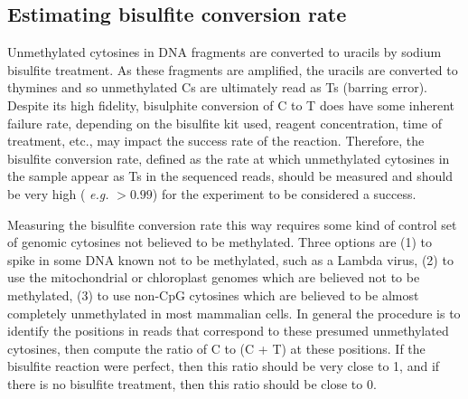 \documentclass[10pt]{article}
\begin{document}


\subsection{Estimating bisulfite conversion rate}
\label{sec:estim-busilf-conv}

Unmethylated cytosines in DNA fragments are converted to uracils by
sodium bisulfite treatment. As these fragments are amplified, the
uracils are converted to thymines and so unmethylated Cs are
ultimately read as Ts (barring error). Despite its high fidelity,
bisulphite conversion of C to T does have some inherent failure rate,
depending on the bisulfite kit used, reagent concentration, time of
treatment, etc., may impact the success rate of the
reaction. Therefore, the bisulfite conversion rate, defined as the
rate at which unmethylated cytosines in the sample appear as Ts in the
sequenced reads, should be measured and should be very high ({\em
  e.g.} $>0.99$) for the experiment to be considered a success.

Measuring the bisulfite conversion rate this way requires some kind of
control set of genomic cytosines not believed to be methylated. Three
options are (1) to spike in some DNA known not to be methylated, such
as a Lambda virus, (2) to use the mitochondrial or chloroplast genomes
which are believed not to be methylated, (3) to use non-CpG cytosines
which are believed to be almost completely unmethylated in most
mammalian cells. In general the procedure is to identify the positions
in reads that correspond to these presumed unmethylated cytosines,
then compute the ratio of C to (C + T) at these positions. If the
bisulfite reaction were perfect, then this ratio should be very close
to 1, and if there is no bisulfite treatment, then this ratio should
be close to 0.
\end{document}
